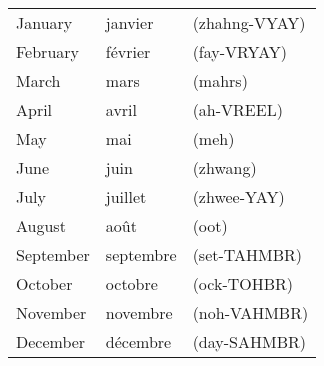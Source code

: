 \begin{tabular}{| l | l | l |}
\hline
January     & janvier       & (zhahng-VYAY) \\
February    & f\'evrier     & (fay-VRYAY)   \\
March       & mars          & (mahrs)       \\
April       & avril         & (ah-VREEL)    \\
May         & mai           & (meh)         \\
June        & juin          & (zhwang)      \\
July        & juillet       & (zhwee-YAY)   \\
August      & ao\^ut        & (oot)         \\
September   & septembre     & (set-TAHMBR)  \\
October     & octobre       & (ock-TOHBR)   \\
November    & novembre      & (noh-VAHMBR)  \\
December    & d\'ecembre    & (day-SAHMBR)  \\
\hline
\end{tabular}

